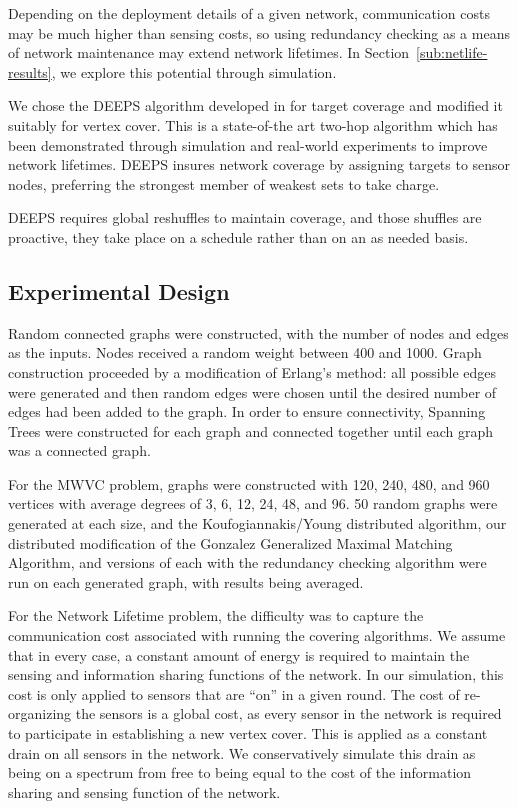 \documentclass[technote, 10pt, letter]{IEEEtran}
\begin{document}
Depending on the deployment details of a given network, communication costs may be much higher than sensing costs, so using redundancy checking as a means of network maintenance may extend network lifetimes. In Section~\ref{sub:netlife-results}, we explore this potential through simulation.

We chose the DEEPS algorithm developed in \cite{1640702}for target coverage and modified it suitably for vertex cover. This is a state-of-the art two-hop algorithm which has been demonstrated through simulation and real-world experiments to improve network lifetimes. DEEPS insures network coverage by assigning targets to sensor nodes, preferring the strongest member of weakest sets to take charge. 

DEEPS requires global reshuffles to maintain coverage, and those shuffles are proactive, they take place on a schedule rather than on an as needed basis.

\subsection{Experimental Design}
\label{sub:exp-design}
Random connected graphs were constructed, with the number of nodes and edges as the inputs. Nodes received a random weight between 400 and 1000. Graph construction proceeded by a modification of Erlang's method: all possible edges were generated and then random edges were chosen until the desired number of edges had been added to the graph. In order to ensure connectivity, Spanning Trees were constructed for each graph and connected together until each graph was a connected graph. 

For the MWVC problem, graphs were constructed with 120, 240, 480, and 960 vertices with average degrees of 3, 6, 12, 24, 48, and 96. 50 random graphs were generated at each size, and the Koufogiannakis/Young distributed algorithm\cite{1582746}, our distributed modification of the Gonzalez Generalized Maximal Matching Algorithm\cite{Gonzalez1995129}, and versions of each with the redundancy checking algorithm were run on each generated graph, with results being averaged.

For the Network Lifetime problem, the difficulty was to capture the communication cost associated with running the covering algorithms. We assume that in every case, a constant amount of energy is required to maintain the sensing and information sharing functions of the network. In our simulation, this cost is only applied to sensors that are ``on'' in a given round. The cost of re-organizing the sensors is a global cost, as every sensor in the network is required to participate in establishing a new vertex cover. This is applied as a constant drain on all sensors in the network. We conservatively simulate this drain as being on a spectrum from free to being equal to the cost of the information sharing and sensing function of the network. 
\end{document}
